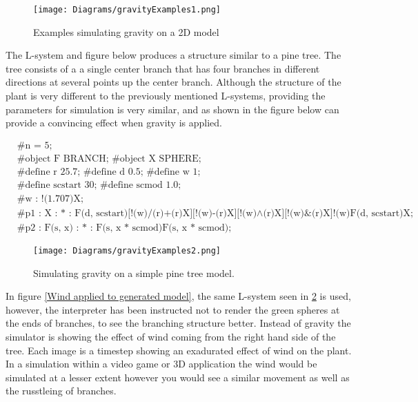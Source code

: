 \begin{figure}[htbp]
	{\centering
		\vspace{7px}
		\texttt{[image: Diagrams/gravityExamples1.png]}
		\label{3DAxisFigure} \label{Gravity applied to generated model 1}
		\caption{Examples simulating gravity on a 2D model}
	}
\end{figure}
\FloatBarrier

\noindent
The L-system and figure below produces a structure similar to a pine tree. The tree consists of a a single center branch that has four branches in different directions at several points up the center branch. Although the structure of the plant is very different to the previously mentioned L-systems, providing the parameters for simulation is very similar, and as shown in the figure below can provide a convincing effect when gravity is applied.

\begin{singlespace}
\begin{equation}
\begin{aligned}
	&\textrm{\#n = 5;} \\
	&\textrm{\#object F BRANCH; \#object X SPHERE;}\\
	&\textrm{\#define r 25.7; \#define d 0.5; \#define w 1;}\\
	&\textrm{\#define scstart 30; \#define scmod 1.0;}\\
	&\textrm{\#w : !(1.707)X;}\\
	&\textrm{\#p1 : X : * : F(d, scstart)[!(w)/(r)+(r)X][!(w)-(r)X][!(w)$\land$(r)X][!(w)\&(r)X]!(w)F(d, scstart)X;}\\
	&\textrm{\#p2 : F(s, x) : * : F(s, x * scmod)F(s, x * scmod);}
\end{aligned}
\end{equation}
\end{singlespace}

\begin{figure}[htbp]
	{\centering
		\vspace{7px}
		\texttt{[image: Diagrams/gravityExamples2.png]}
		\label{3DAxisFigure} \label{Gravity applied to generated model 1}
		\caption{Simulating gravity on a simple pine tree model.}
	}
\end{figure}
\FloatBarrier

\noindent
In figure \ref{Wind applied to generated model}, the same L-system seen in \ref{Gravity applied to generated model 1} is used, however, the interpreter has been instructed not to render the green spheres at the ends of branches, to see the branching structure better. Instead of gravity the simulator is showing the effect of wind coming from the right hand side of the tree. Each image is a timestep showing an exadurated effect of wind on the plant. In a simulation within a video game or 3D application the wind would be simulated at a lesser extent however you would see a similar movement as well as the russtleing of branches.

